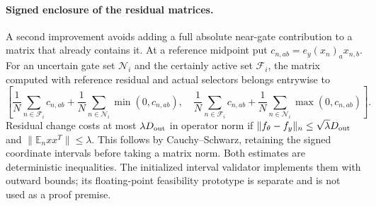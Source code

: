 \paragraph{Signed enclosure of the residual matrices.}
A second improvement avoids adding a full absolute near-gate contribution
to a matrix that already contains it. At a reference midpoint put
$c_{n,ab}=e_y(x_n)_a x_{n,b}$. For an uncertain gate set $\mathcal N_i$
and the certainly active set $\mathcal F_i$, the matrix computed with
reference residual and actual selectors belongs entrywise to
\[
 \left[\frac1N\sum_{n\in\mathcal F_i}c_{n,ab}
       +\frac1N\sum_{n\in\mathcal N_i}\min(0,c_{n,ab}),\quad
       \frac1N\sum_{n\in\mathcal F_i}c_{n,ab}
       +\frac1N\sum_{n\in\mathcal N_i}\max(0,c_{n,ab})\right].
\]
Residual change costs at most $\lambda D_{\rm out}$ in operator norm if
$\|f_\theta-f_y\|_n\le\sqrt\lambda D_{\rm out}$ and
$\|\mathbb E_n xx^T\|\le\lambda$. This follows by Cauchy--Schwarz,
retaining the signed coordinate intervals before taking a matrix norm.
Both estimates are deterministic inequalities. The initialized interval
validator implements them with outward bounds; its floating-point
feasibility prototype is separate and is not used as a proof premise.
